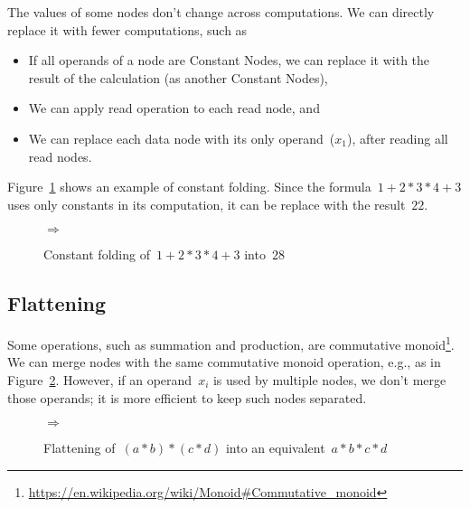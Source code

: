 \documentclass{article}
\begin{document}
The values of some nodes don't change across computations.
We can directly replace it with fewer computations, such as
%
\begin{itemize}
	\item If all operands of a node are Constant Nodes, we can replace it with the result of the calculation (as another Constant Nodes),
	\item We can apply read operation to each read node, and
	\item We can replace each data node with its only operand~($x_1$), after reading all read nodes.
\end{itemize}
%
Figure~\ref{fig:optimization:folding-example} shows an example of constant folding.
Since the formula~$1 + 2 * 3 * 4 + 3$ uses only constants in its computation, it can be replace with the result~$22$.
%
\begin{figure}
	\centering
	\quad$\Rightarrow$\quad
	\caption{Constant folding of~$1 + 2 * 3 * 4 + 3$  into~$28$}
	\label{fig:optimization:folding-example}
\end{figure}

\subsection{Flattening}

Some operations, such as summation and production, are commutative monoid\footnote{
	\url{https://en.wikipedia.org/wiki/Monoid\#Commutative_monoid}
}.
We can merge nodes with the same commutative monoid operation, e.g., as in Figure~\ref{fig:optimization:flatten-example}.
However, if an operand~$x_i$ is used by multiple nodes, we don't merge those operands; it is more efficient to keep such nodes separated.
%
\begin{figure}
	\centering
	\quad$\Rightarrow$\quad
	\caption{Flattening of~$(a * b) * (c * d)$ into an equivalent~$a * b * c * d$}
	\label{fig:optimization:flatten-example}
\end{figure}
\end{document}
